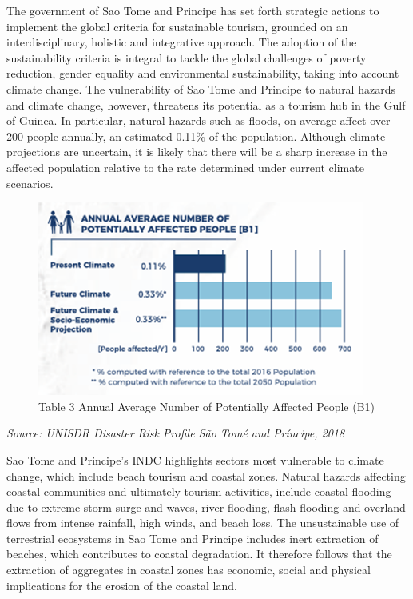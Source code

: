 \documentclass[
]{book}
\begin{document}
The government of Sao Tome and Principe has set forth strategic actions to implement the global criteria for sustainable tourism, grounded on an interdisciplinary, holistic and integrative approach. The adoption of the sustainability criteria is integral to tackle the global challenges of poverty reduction, gender equality and environmental sustainability, taking into account climate change. The vulnerability of Sao Tome and Principe to natural hazards and climate change, however, threatens its potential as a tourism hub in the Gulf of Guinea. In particular, natural hazards such as floods, on average affect over 200 people annually, an estimated 0.11\% of the population. Although climate projections are uncertain, it is likely that there will be a sharp increase in the affected population relative to the rate determined under current climate scenarios.

\begin{figure}
\centering
\includegraphics{images/affected_pple.png}
\caption{Table 3 Annual Average Number of Potentially Affected People (B1)}
\end{figure}

\emph{Source: UNISDR Disaster Risk Profile São Tomé and Príncipe, 2018}

Sao Tome and Principe's INDC highlights sectors most vulnerable to climate change, which include beach tourism and coastal zones. Natural hazards affecting coastal communities and ultimately tourism activities, include coastal flooding due to extreme storm surge and waves, river flooding, flash flooding and overland flows from intense rainfall, high winds, and beach loss. The unsustainable use of terrestrial ecosystems in Sao Tome and Principe includes inert extraction of beaches, which contributes to coastal degradation. It therefore follows that the extraction of aggregates in coastal zones has economic, social and physical implications for the erosion of the coastal land.
\end{document}
